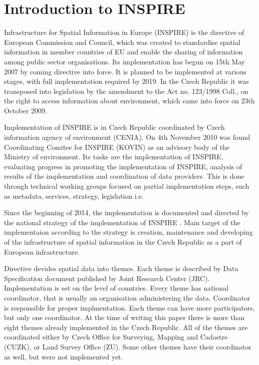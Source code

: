 \documentclass[eprint]{actapoly}
\begin{document}
\section{Introduction to INSPIRE}
Infrastructure for Spatial Information in Europe (INSPIRE) is the directive of European Commission and Council, which was created to standardise spatial information in member countries of EU and enable the sharing of information among public sector organisations. Its implementation has begun on 15th May 2007 by coming directive into force. It is planned to be implemented at various stages, with full implementation required by 2019. In the Czech Republic it was transposed into legislation by the amendment to the Act no. 123/1998 Coll., on the right to access information about environment, which came into force on 23th October 2009. 

Implementation of INSPIRE is in Czech Republic coordinated by Czech information agency of environment (CENIA). On 4th November 2010 was found Coordinating Comitee for INSPIRE (KOVIN) as an advisory body of the Ministry of environment. Its tasks are the implementation of INSPIRE, evaluating progress in promoting the implementation of INSPIRE, analysis of results of the implementation and coordination of data providers. This is done through technical working groups focused on partial implementation steps, such as metadata, services, strategy, legislation i.e.
\cite{KOVIN - http://inspire.gov.cz/kovin}

Since the beginning of 2014, the implementation is documented and directed by the national strategy of the implementation of INSPIRE \cite{strategie - http://inspire.gov.cz/sites/default/files/documents/Strategie ImplementaceINSPIRE.pdf}. Main target of the implementaion according to the strategy is creation, maintenance and developing of the infrastructure of spatial information in the Czech Republic as a part of European infrastructure.

Directive devides spatial data into themes. Each theme is described by Data Specification document published by Joint Research Center (JRC). Implementation is set on the level of countries. Every theme has national coordinator, that is usually an organisation administering the data. Coordinator is responsible for proper implmentation. Each theme can have more participators, but only one coordinator. At the time of writing this paper there is more than eight themes already implemented in the Czech Republic. All of the themes are coordinated either by Czech Office for Surveying, Mapping and Cadastre (CUZK), or Land Survey Office (ZU). Some other themes have their coordinator as well, but were not implemented yet.
\end{document}
